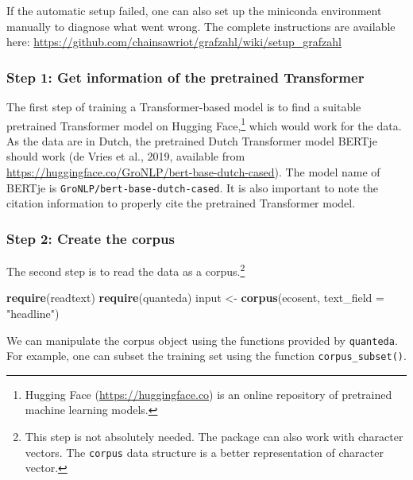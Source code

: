 \documentclass[
  english,
  man,floatsintext]{apa6}
\newenvironment{Shaded}{\begin{snugshade}}{\end{snugshade}}
\newcommand{\DataTypeTok}[1]{\textcolor[rgb]{0.13,0.29,0.53}{#1}}
\newcommand{\KeywordTok}[1]{\textcolor[rgb]{0.13,0.29,0.53}{\textbf{#1}}}
\newcommand{\NormalTok}[1]{#1}
\newcommand{\StringTok}[1]{\textcolor[rgb]{0.31,0.60,0.02}{#1}}
\begin{document}
If the automatic setup failed, one can also set up the miniconda environment manually to diagnose what went wrong. The complete instructions are available here: \url{https://github.com/chainsawriot/grafzahl/wiki/setup_grafzahl}

\hypertarget{step-1-get-information-of-the-pretrained-transformer}{%
\subsubsection{Step 1: Get information of the pretrained Transformer}\label{step-1-get-information-of-the-pretrained-transformer}}

The first step of training a Transformer-based model is to find a suitable pretrained Transformer model on Hugging Face,\footnote{Hugging Face (\url{https://huggingface.co}) is an online repository of pretrained machine learning models.} which would work for the data. As the data are in Dutch, the pretrained Dutch Transformer model BERTje should work (de Vries et al., 2019, available from \url{https://huggingface.co/GroNLP/bert-base-dutch-cased}). The model name of BERTje is \texttt{GroNLP/bert-base-dutch-cased}. It is also important to note the citation information to properly cite the pretrained Transformer model.

\hypertarget{step-2-create-the-corpus}{%
\subsubsection{Step 2: Create the corpus}\label{step-2-create-the-corpus}}

The second step is to read the data as a corpus.\footnote{This step is not absolutely needed. The package can also work with character vectors. The \texttt{corpus} data structure is a better representation of character vector.}

\begin{Shaded}
\begin{Highlighting}[]
\KeywordTok{require}\NormalTok{(readtext)}
\KeywordTok{require}\NormalTok{(quanteda)}
\NormalTok{input \textless{}{-}}\StringTok{ }\KeywordTok{corpus}\NormalTok{(ecosent, }\DataTypeTok{text\_field =} \StringTok{"headline"}\NormalTok{)}
\end{Highlighting}
\end{Shaded}

We can manipulate the corpus object using the functions provided by \texttt{quanteda}. For example, one can subset the training set using the function \texttt{corpus\_subset()}.
\end{document}
